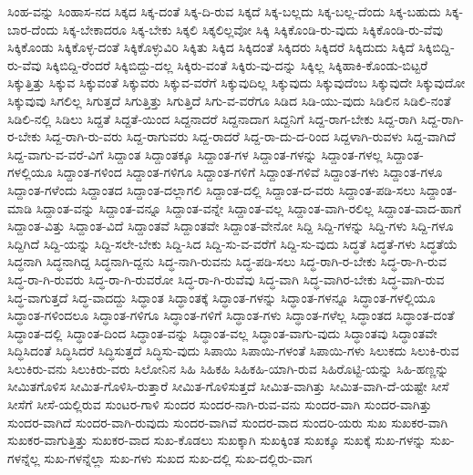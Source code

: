 {ಸಿಂಹ-ವನ್ನು
ಸಿಂಹಾಸ-ನದ
ಸಿಕ್ಕದ
ಸಿಕ್ಕ-ದಂತೆ
ಸಿಕ್ಕ-ದಿ-ರುವ
ಸಿಕ್ಕದೆ
ಸಿಕ್ಕ-ಬಲ್ಲದು
ಸಿಕ್ಕ-ಬಲ್ಲ-ದೆಂದು
ಸಿಕ್ಕ-ಬಹುದು
ಸಿಕ್ಕ-ಬಾರ-ದೆಂದು
ಸಿಕ್ಕ-ಬೇಕಾದರೂ
ಸಿಕ್ಕ-ಬೇಕು
ಸಿಕ್ಕಲಿ
ಸಿಕ್ಕಲಿಲ್ಲವೋ
ಸಿಕ್ಕಿ
ಸಿಕ್ಕಿಕೊಂಡಿ-ರು-ವುದು
ಸಿಕ್ಕಿಕೊಂಡಿ-ರು-ವೆವು
ಸಿಕ್ಕಿಕೊಂಡು
ಸಿಕ್ಕಿಕೊಳ್ಳ-ದಂತೆ
ಸಿಕ್ಕಿಕೊಳ್ಳುವಿರಿ
ಸಿಕ್ಕಿತು
ಸಿಕ್ಕಿದ
ಸಿಕ್ಕಿದಂತೆ
ಸಿಕ್ಕಿದರು
ಸಿಕ್ಕಿದರೆ
ಸಿಕ್ಕಿದುದು
ಸಿಕ್ಕಿದೆ
ಸಿಕ್ಕಿಬಿದ್ದಿ-ರು-ವೆವು
ಸಿಕ್ಕಿಬಿದ್ದಿ-ರೆಂದರೆ
ಸಿಕ್ಕಿಬಿದ್ದು-ದಲ್ಲ
ಸಿಕ್ಕಿರು-ವಂತೆ
ಸಿಕ್ಕಿರು-ವು-ದನ್ನು
ಸಿಕ್ಕಿಲ್ಲ
ಸಿಕ್ಕಿಹಾಕಿ-ಕೊಂಡು-ಬಿಟ್ಟರೆ
ಸಿಕ್ಕುತ್ತಿತ್ತು
ಸಿಕ್ಕುವ
ಸಿಕ್ಕುವಂತೆ
ಸಿಕ್ಕುವರು
ಸಿಕ್ಕುವ-ವರೆಗೆ
ಸಿಕ್ಕುವುದಿಲ್ಲ
ಸಿಕ್ಕುವುದು
ಸಿಕ್ಕುವುದೆಂಬ
ಸಿಕ್ಕುವುದೇ
ಸಿಕ್ಕುವುದೋ
ಸಿಕ್ಕುವುವು
ಸಿಗಲಿಲ್ಲ
ಸಿಗುತ್ತದೆ
ಸಿಗುತ್ತಿತ್ತು
ಸಿಗುತ್ತಿದೆ
ಸಿಗು-ವ-ವರೆಗೂ
ಸಿಡಿದ
ಸಿಡಿ-ಯು-ವುದು
ಸಿಡಿಲಿನ
ಸಿಡಿಲಿ-ನಂತೆ
ಸಿಡಿಲಿ-ನಲ್ಲಿ
ಸಿಡಿಲು
ಸಿದ್ದತೆ
ಸಿದ್ದತೆ-ಯಿಂದ
ಸಿದ್ದನಾದರೆ
ಸಿದ್ದನಾದಾಗ
ಸಿದ್ದನಿಗೆ
ಸಿದ್ದ-ರಾಗ-ಬೇಕು
ಸಿದ್ದ-ರಾಗಿ
ಸಿದ್ದ-ರಾಗಿ-ರ-ಬೇಕು
ಸಿದ್ದ-ರಾಗಿ-ರು-ವರು
ಸಿದ್ದ-ರಾಗುವರು
ಸಿದ್ದ-ರಾದರೆ
ಸಿದ್ದ-ರಾ-ದು-ದ-ರಿಂದ
ಸಿದ್ದಳಾಗಿ-ರುವಳು
ಸಿದ್ದ-ವಾಗಿದೆ
ಸಿದ್ದ-ವಾಗು-ವ-ವರೆ-ವಿಗೆ
ಸಿದ್ದಾಂತ
ಸಿದ್ದಾಂತಕ್ಕೂ
ಸಿದ್ದಾಂತ-ಗಳ
ಸಿದ್ದಾಂತ-ಗಳನ್ನು
ಸಿದ್ದಾಂತ-ಗಳಲ್ಲ
ಸಿದ್ದಾಂತ-ಗಳಲ್ಲಿಯೂ
ಸಿದ್ದಾಂತ-ಗಳಿಂದ
ಸಿದ್ದಾಂತ-ಗಳಿಗೂ
ಸಿದ್ದಾಂತ-ಗಳಿಗೆ
ಸಿದ್ದಾಂತ-ಗಳಿವೆ
ಸಿದ್ದಾಂತ-ಗಳು
ಸಿದ್ದಾಂತ-ಗಳೂ
ಸಿದ್ದಾಂತ-ಗಳೆಂದು
ಸಿದ್ದಾಂತದ
ಸಿದ್ದಾಂತ-ದಲ್ಲಾಗಲಿ
ಸಿದ್ದಾಂತ-ದಲ್ಲಿ
ಸಿದ್ದಾಂತ-ದ-ವರು
ಸಿದ್ದಾಂತ-ಪಡಿ-ಸಲು
ಸಿದ್ದಾಂತ-ಮಾಡಿ
ಸಿದ್ದಾಂತ-ವನ್ನು
ಸಿದ್ದಾಂತ-ವನ್ನೂ
ಸಿದ್ದಾಂತ-ವನ್ನೇ
ಸಿದ್ದಾಂತ-ವಲ್ಲ
ಸಿದ್ದಾಂತ-ವಾಗಿ-ರಲಿಲ್ಲ
ಸಿದ್ದಾಂತ-ವಾದ-ಹಾಗೆ
ಸಿದ್ದಾಂತ-ವಿತ್ತು
ಸಿದ್ದಾಂತ-ವಿದೆ
ಸಿದ್ದಾಂತವೆ
ಸಿದ್ದಾಂತವೇ
ಸಿದ್ದಾಂತ-ವೇನೋ
ಸಿದ್ದಿ
ಸಿದ್ದಿ-ಗಳನ್ನು
ಸಿದ್ದಿ-ಗಳು
ಸಿದ್ದಿ-ಗಳೂ
ಸಿದ್ದಿಗಿದೆ
ಸಿದ್ದಿ-ಯನ್ನು
ಸಿದ್ದಿ-ಸಲೇ-ಬೇಕು
ಸಿದ್ದಿ-ಸಿದ
ಸಿದ್ದಿ-ಸು-ವ-ವರೆಗೆ
ಸಿದ್ದಿ-ಸು-ವುದು
ಸಿದ್ಧತೆ
ಸಿದ್ಧತೆ-ಗಳು
ಸಿದ್ಧತೆಯೆ
ಸಿದ್ಧನಾಗಿ
ಸಿದ್ಧನಾಗಿದ್ದ
ಸಿದ್ಧನಾಗಿ-ದ್ದನು
ಸಿದ್ಧ-ನಾಗಿ-ರುವನು
ಸಿದ್ಧ-ಪಡಿ-ಸಲು
ಸಿದ್ಧ-ರಾಗಿ-ರ-ಬೇಕು
ಸಿದ್ಧ-ರಾ-ಗಿ-ರುವ
ಸಿದ್ಧ-ರಾ-ಗಿ-ರುವರು
ಸಿದ್ಧ-ರಾ-ಗಿ-ರುವರೋ
ಸಿದ್ಧ-ರಾ-ಗಿ-ರುವೆವು
ಸಿದ್ಧ-ವಾಗಿ
ಸಿದ್ಧ-ವಾಗಿರ-ಬೇಕು
ಸಿದ್ಧ-ವಾಗಿ-ರುವ
ಸಿದ್ಧ-ವಾಗುತ್ತದೆ
ಸಿದ್ಧ-ವಾದದ್ದು
ಸಿದ್ಧಾಂತ
ಸಿದ್ಧಾಂತಕ್ಕೆ
ಸಿದ್ಧಾಂತ-ಗಳನ್ನು
ಸಿದ್ಧಾಂತ-ಗಳನ್ನೂ
ಸಿದ್ಧಾಂತ-ಗಳಲ್ಲಿಯೂ
ಸಿದ್ಧಾಂತ-ಗಳಿಂದಲೂ
ಸಿದ್ಧಾಂತ-ಗಳಿಗೂ
ಸಿದ್ಧಾಂತ-ಗಳಿಗೆ
ಸಿದ್ಧಾಂತ-ಗಳು
ಸಿದ್ಧಾಂತ-ಗಳೆಲ್ಲ
ಸಿದ್ಧಾಂತದ
ಸಿದ್ಧಾಂತ-ದಂತೆ
ಸಿದ್ಧಾಂತ-ದಲ್ಲಿ
ಸಿದ್ಧಾಂತ-ದಿಂದ
ಸಿದ್ಧಾಂತ-ವನ್ನು
ಸಿದ್ಧಾಂತ-ವಲ್ಲ
ಸಿದ್ಧಾಂತ-ವಾಗು-ವುದು
ಸಿದ್ಧಾಂತವು
ಸಿದ್ಧಾಂತವೇ
ಸಿದ್ಧಿಸಿದಂತೆ
ಸಿದ್ಧಿಸಿದರೆ
ಸಿದ್ಧಿಸುತ್ತದೆ
ಸಿದ್ಧಿಸು-ವುದು
ಸಿಪಾಯಿ
ಸಿಪಾಯಿ-ಗಳಂತೆ
ಸಿಪಾಯಿ-ಗಳು
ಸಿಲುಕದು
ಸಿಲುಕಿ-ರುವ
ಸಿಲುಕಿರು-ವನು
ಸಿಲುಕಿರು-ವರು
ಸಿಲೋನಿನ
ಸಿಹಿ
ಸಿಹಿಕಹಿ
ಸಿಹಿಕಹಿ-ಯಾಗಿ-ರುವ
ಸಿಹಿರೊಟ್ಟಿ-ಯನ್ನು
ಸಿಹಿ-ಹಣ್ಣನ್ನು
ಸೀಮಿತಗೊಳಿಸ
ಸೀಮಿತ-ಗೊಳಿಸಿ-ರುತ್ತಾರೆ
ಸೀಮಿತ-ಗೊಳಿಸುತ್ತದೆ
ಸೀಮಿತ-ವಾಗಿತ್ತು
ಸೀಮಿತ-ವಾಗಿ-ದೆ-ಯಷ್ಟೇ
ಸೀಸೆ
ಸೀಸೆಗೆ
ಸೀಸೆ-ಯಲ್ಲಿರುವ
ಸುಂಟರ-ಗಾಳಿ
ಸುಂದರ
ಸುಂದರ-ನಾಗಿ-ರುವ-ವನು
ಸುಂದರ-ವಾಗಿ
ಸುಂದರ-ವಾಗಿತ್ತು
ಸುಂದರ-ವಾಗಿದೆ
ಸುಂದರ-ವಾಗಿ-ರುವುದು
ಸುಂದರ-ವಾಗಿವೆ
ಸುಂದರ-ವಾದ
ಸುಂದರಿ-ಯರು
ಸುಖ
ಸುಖಕರ-ವಾಗಿ
ಸುಖಕರ-ವಾಗುತ್ತಿತ್ತು
ಸುಖಕರ-ವಾದ
ಸುಖ-ಕೊಡಲು
ಸುಖಕ್ಕಾಗಿ
ಸುಖಕ್ಕಿಂತ
ಸುಖಕ್ಕೂ
ಸುಖಕ್ಕೆ
ಸುಖ-ಗಳನ್ನು
ಸುಖ-ಗಳನ್ನೆಲ್ಲ
ಸುಖ-ಗಳನ್ನೆಲ್ಲಾ
ಸುಖ-ಗಳು
ಸುಖದ
ಸುಖ-ದಲ್ಲಿ
ಸುಖ-ದಲ್ಲಿರು-ವಾಗ
}
